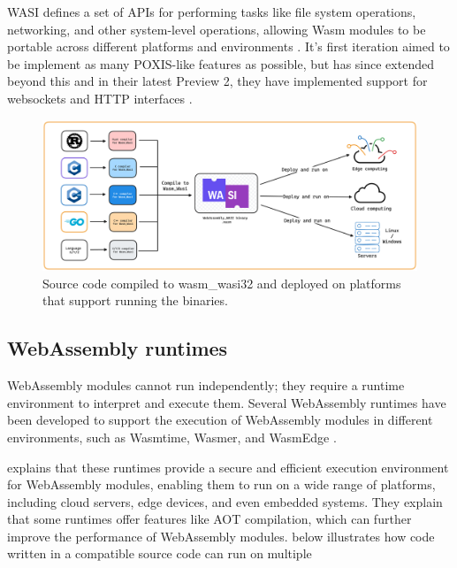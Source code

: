 \documentclass[
  table]{report}
\begin{document}
\ac{WASI} defines a set of APIs for performing tasks like file system
operations, networking, and other system-level operations, allowing
\ac{Wasm} modules to be portable across different platforms and
environments \citep{WASIDev}. It's first iteration aimed to be implement
as many POXIS-like features as possible, but has since extended beyond
this and in their latest Preview 2, they have implemented support for
websockets and HTTP interfaces \citep{WASIPreview2README}.

\begin{figure}[H]
\centering
  \includegraphics{assets/3-wasi-figure.png}
  \caption{Source code compiled to wasm\_wasi32 and deployed on platforms that support running the binaries.}
  \label{fig:wasm-wasi}
\end{figure}

\subsection{WebAssembly runtimes}

WebAssembly modules cannot run independently; they require a runtime
environment to interpret and execute them. Several WebAssembly runtimes
have been developed to support the execution of WebAssembly modules in
different environments, such as Wasmtime, Wasmer, and WasmEdge
\citep{zhang2024}.

\citet{zhang2024} explains that these runtimes provide a secure and
efficient execution environment for WebAssembly modules, enabling them
to run on a wide range of platforms, including cloud servers, edge
devices, and even embedded systems. They explain that some runtimes
offer features like \ac{AOT} compilation, which can further improve the
performance of WebAssembly modules.  below
illustrates how code written in a compatible source code can run on
multiple
\end{document}
